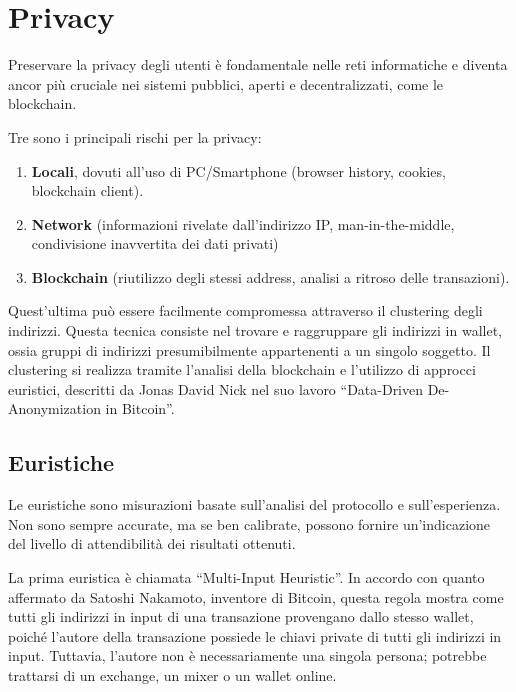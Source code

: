 \chapter{Privacy}
\newtheorem{definition}{Definition}
Preservare la privacy degli utenti è fondamentale nelle reti informatiche e diventa ancor più cruciale nei sistemi pubblici, aperti e decentralizzati, come le blockchain. 

Tre sono i principali rischi per la privacy:
\begin{enumerate}
    \item \textbf{Locali}, dovuti all'uso di PC/Smartphone (browser history, cookies, blockchain client).
    \item \textbf{Network} (informazioni rivelate dall'indirizzo IP, man-in-the-middle, condivisione inavvertita dei dati privati)
    \item \textbf{Blockchain} (riutilizzo degli stessi address, analisi a ritroso delle transazioni).
\end{enumerate}

Quest'ultima può essere facilmente compromessa attraverso il clustering degli indirizzi. Questa tecnica consiste nel trovare e raggruppare gli indirizzi in wallet, ossia gruppi di indirizzi presumibilmente appartenenti a un singolo soggetto. Il clustering si realizza tramite l’analisi della blockchain e l’utilizzo di approcci euristici, descritti da Jonas David Nick nel suo lavoro “Data-Driven De-Anonymization in Bitcoin”.

\section{Euristiche}
Le euristiche sono misurazioni basate sull’analisi del protocollo e sull’esperienza. Non sono sempre accurate, ma se ben calibrate, possono fornire un'indicazione del livello di attendibilità dei risultati ottenuti. 

La prima euristica è chiamata “Multi-Input Heuristic”. In accordo con quanto affermato da Satoshi Nakamoto, inventore di Bitcoin, questa regola mostra come tutti gli indirizzi in input di una transazione provengano dallo stesso wallet, poiché l’autore della transazione possiede le chiavi private di tutti gli indirizzi in input. Tuttavia, l’autore non è necessariamente una singola persona; potrebbe trattarsi di un exchange, un mixer o un wallet online. 

